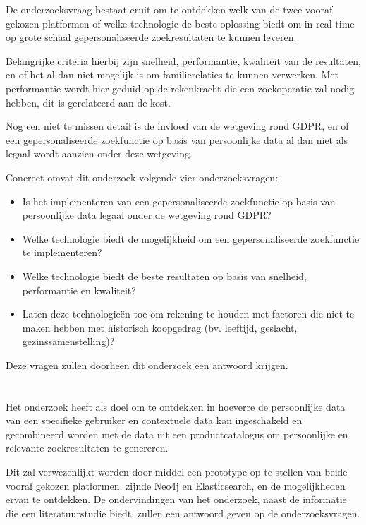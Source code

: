 De onderzoeksvraag bestaat eruit om te ontdekken welk van de twee vooraf gekozen platformen of welke technologie de beste oplossing biedt om in real-time op grote schaal gepersonaliseerde zoekresultaten te kunnen leveren.

Belangrijke criteria hierbij zijn snelheid, performantie, kwaliteit van de resultaten, en of het al dan niet mogelijk is om familierelaties te kunnen verwerken. Met performantie wordt hier geduid op de rekenkracht die een zoekoperatie zal nodig hebben, dit is gerelateerd aan de kost. 

Nog een niet te missen detail is de invloed van de wetgeving rond GDPR, en of een gepersonaliseerde zoekfunctie op basis van persoonlijke data al dan niet als legaal wordt aanzien onder deze wetgeving.

Concreet omvat dit onderzoek volgende vier onderzoeksvragen:
\begin{itemize}
	\item Is het implementeren van een gepersonaliseerde zoekfunctie op basis van persoonlijke data legaal onder de wetgeving rond GDPR?
	\item Welke technologie biedt de mogelijkheid om een gepersonaliseerde zoekfunctie te implementeren?
	\item Welke technologie biedt de beste resultaten op basis van snelheid, performantie en kwaliteit?
	\item Laten deze technologieën toe om rekening te houden met factoren die niet te maken hebben met historisch koopgedrag (bv. leeftijd, geslacht, gezinssamenstelling)?
\end{itemize} 

Deze vragen zullen doorheen dit onderzoek een antwoord krijgen.

\section{}
\label{sec:onderzoeksdoelstelling}

Het onderzoek heeft als doel om te ontdekken in hoeverre de persoonlijke data van een specifieke gebruiker en contextuele data kan ingeschakeld en gecombineerd worden met de data uit een productcatalogus om persoonlijke en relevante zoekresultaten te genereren.

Dit zal verwezenlijkt worden door middel een prototype op te stellen van beide vooraf gekozen platformen, zijnde Neo4j en Elasticsearch, en de mogelijkheden ervan te ontdekken. De ondervindingen van het onderzoek, naast de informatie die een literatuurstudie biedt, zullen een antwoord geven op de onderzoeksvragen.

